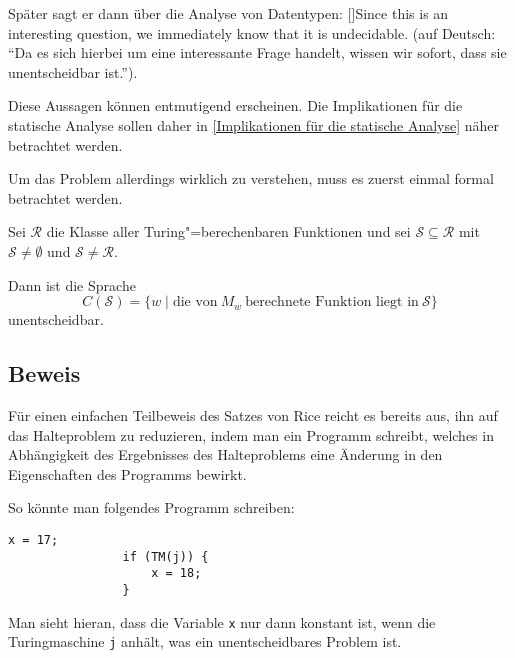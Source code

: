         Später sagt er dann über die Analyse von Datentypen:
        [{\cite[7]{Schwartzbach2007}}]{Since this is an interesting question,
        we immediately know that it is undecidable.}
        (auf Deutsch:
        \enquote{Da es sich hierbei um eine interessante Frage handelt,
        wissen wir sofort,
        dass sie unentscheidbar ist.}).

        Diese Aussagen können entmutigend erscheinen.
        Die Implikationen für die statische Analyse sollen daher in
        \vref{Implikationen für die statische Analyse} näher betrachtet werden.

        Um das Problem allerdings wirklich zu verstehen,
        muss es zuerst einmal formal betrachtet werden.

        \begin{theorem}\cite[185]{Kuske2011}
            Sei \( \mathcal{R} \) die Klasse aller Turing"=berechenbaren Funktionen und
            sei \( \mathcal{S} \subseteq \mathcal{R} \) mit \( \mathcal{S} \neq \emptyset \) und
            \( \mathcal{S} \neq \mathcal{R} \).

            Dann ist die Sprache
            \[
                C(\mathcal{S}) = \{w \mid \text{die von}\ M_w\
                \text{berechnete Funktion liegt in}\ \mathcal{S}\}
            \]
            unentscheidbar.
        \end{theorem}

        \subsection{Beweis}
            Für einen einfachen Teilbeweis des Satzes von Rice reicht es bereits aus,
            ihn auf das Halteproblem zu reduzieren,
            indem man ein Programm schreibt,
            welches in Abhängigkeit des Ergebnisses des Halteproblems eine Änderung in den Eigenschaften des Programms bewirkt.

            So könnte man folgendes Programm schreiben:

            \begin{lstlisting}[caption={Das Halteproblem entscheidet über den konstanten Wert einer Variable},
                label={lst:Halteproblem_konstant}, gobble=16]
                x = 17;
                if (TM(j)) {
                    x = 18;
                }
            \end{lstlisting}

            Man sieht hieran,
            dass die Variable
            \lstinline{x} nur dann konstant ist,
            wenn die Turingmaschine
            \lstinline{j} anhält,
            was ein unentscheidbares Problem ist.\cite[3]{Schwartzbach2007}

